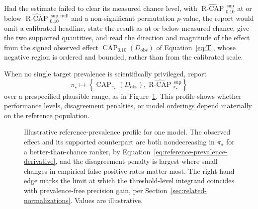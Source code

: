 \documentclass[11pt]{article}
\newcommand{\CAP}{\operatorname{CAP}}
\newcommand{\Tpi}{\CAP_{\pi_\star}}
\newcommand{\RCAPHat}{\widehat{\operatorname{R\text{-}CAP}}{}^{\,\mathrm{sup}}_{\pi_\star}}
\theoremstyle{remark}
\begin{document}
Had the estimate failed to clear its measured chance level, with $\widehat{\operatorname{R\text{-}CAP}}{}^{\,\mathrm{sup}}_{0.10}$ at or below $\widehat{\operatorname{R\text{-}CAP}}{}^{\,\mathrm{sup,null}}_{0.10}$ and a non-significant permutation $p$-value, the report would omit a calibrated headline, state the result as at or below measured chance, give the two supported quantities, and read the direction and magnitude of the effect from the signed observed effect $\CAP_{0.10}(D_{\mathrm{obs}})$ of Equation~\eqref{eq:T}, whose negative region is ordered and bounded, rather than from the calibrated scale.

When no single target prevalence is scientifically privileged, report
\[
\pi_\star
\longmapsto
\left\{
\Tpi(D_{\mathrm{obs}}),
\RCAPHat
\right\}
\]
over a prespecified plausible range, as in Figure~\ref{fig:profile}. This profile shows whether performance levels, disagreement penalties, or model orderings depend materially on the reference population.

\begin{figure}[ht]
\centering
{}
\caption{Illustrative reference-prevalence profile for one model. The observed effect and its supported counterpart are both nondecreasing in $\pi_\star$ for a better-than-chance ranker, by Equation~\eqref{eq:reference-prevalence-derivative}, and the disagreement penalty is largest where small changes in empirical false-positive rates matter most. The right-hand edge marks the limit at which the threshold-level integrand coincides with prevalence-free precision gain, per Section~\ref{sec:related-normalizations}. Values are illustrative.}
\label{fig:profile}
\end{figure}
\end{document}
